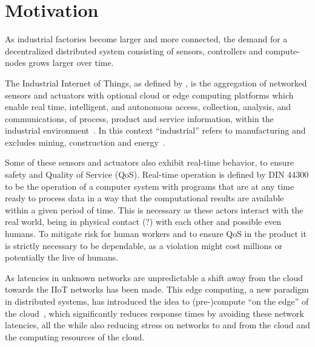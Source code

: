 \section{Motivation}


As industrial factories become larger and more connected, the demand for a
decentralized distributed system consisting of sensors, controllers and
compute-nodes grows larger over time.

The Industrial Internet of Things, as defined by
\citeauthor{boyes_industrial_2018}, is the aggregation of networked sensors and
actuators with optional cloud or edge computing platforms which enable real
time, intelligent, and autonomous access, collection, analysis, and
communications, of process, product and service information, within the
industrial environment~\cite{boyes_industrial_2018}. In this context
\enquote{industrial} refers to manufacturing and excludes mining, construction
and energy~\cite{noauthor_industry_nodate}.

Some of these sensors and actuators also exhibit real-time behavior, to ensure
safety and Quality of Service (QoS). Real-time operation is defined by DIN 44300
to be the operation of a computer system with programs that are at any time
ready to process data in a way that the computational results are available
within a given period of time. This is necessary as these actors interact with
the real world, being in physical contact (?) with each other and possible even
humans. To mitigate risk for human workers and to ensure QoS in the product it
is strictly necessary to be dependable, as a violation might cost millions or
potentially the live of humans.


As latencies in unknown networks are unpredictable a shift away from the cloud
towards the IIoT networks has been made. This edge computing, a new paradigm in
distributed systems, has introduced the idea to (pre-)compute \enquote{on the
edge} of the cloud~\cite{shi_edge_2016}, which significantly reduces response
times by avoiding these network latencies, all the while also reducing stress on
networks to and from the cloud and the computing resources of the cloud.


